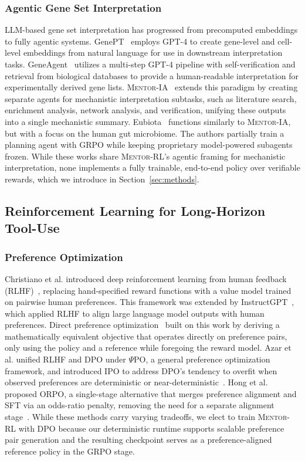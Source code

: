 \documentclass[thesis,letterpaper,12pt]{utthesis}
\begin{document}
\subsubsection{Agentic Gene Set Interpretation}
LLM-based gene set interpretation has progressed from precomputed embeddings to fully agentic systems. GenePT~\cite{chen2025simple} employs GPT-4 to create gene-level and cell-level embeddings from natural language for use in downstream interpretation tasks. GeneAgent~\cite{wang2025geneagent} utilizes a multi-step GPT-4 pipeline with self-verification and retrieval from biological databases to provide a human-readable interpretation for experimentally derived gene lists. \textsc{Mentor-IA}~\cite{mentor-ia} extends this paradigm by creating separate agents for mechanistic interpretation subtasks, such as literature search, enrichment analysis, network analysis, and verification, unifying these outputs into a single mechanistic summary. Eubiota~\cite{eubiota} functions similarly to \textsc{Mentor-IA}, but with a focus on the human gut microbiome. The authors partially train a planning agent with GRPO while keeping proprietary model-powered subagents frozen. While these works share \textsc{Mentor-RL}'s agentic framing for mechanistic interpretation, none implements a fully trainable, end-to-end policy over verifiable rewards, which we introduce in Section~\ref{sec:methods}.

\subsection{Reinforcement Learning for Long-Horizon Tool-Use}
\subsubsection{Preference Optimization}
Christiano et al. introduced deep reinforcement learning from human feedback (RLHF)~\cite{christiano2017rlhf}, replacing hand-specified reward functions with a value model trained on pairwise human preferences. This framework was extended by InstructGPT~\cite{ouyang2022instructgpt}, which applied RLHF to align large language model outputs with human preferences. Direct preference optimization~\cite{dpo} built on this work by deriving a mathematically equivalent objective that operates directly on preference pairs, only using the policy and a reference while foregoing the reward model. Azar et al. unified RLHF and DPO under $\Psi$PO, a general preference optimization framework, and introduced IPO to address DPO's tendency to overfit when observed preferences are deterministic or near-deterministic~\cite{azar2024general}. Hong et al. proposed ORPO, a single-stage alternative that merges preference alignment and SFT via an odds-ratio penalty, removing the need for a separate alignment stage~\cite{hong2024orpo}. While these methods carry varying tradeoffs, we elect to train \textsc{Mentor-RL} with DPO because our deterministic runtime supports scalable preference pair generation and the resulting checkpoint serves as a preference-aligned reference policy in the GRPO stage.
\end{document}
